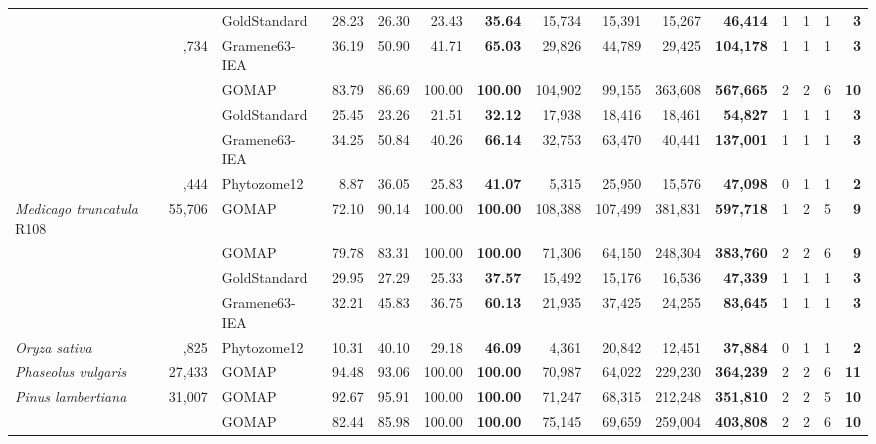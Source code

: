 \documentclass[utf8]{frontiersSCNS}
\begin{document}
\begin{table}[t]
{\begin{threeparttable}
\begin{tabular}{lrlrrr>{\bfseries}r|rrr>{\bfseries}r|rrr>{\bfseries}r}
 &  & GoldStandard & 28.23 & 26.30 & 23.43 & 35.64 & 15,734 & 15,391 & 15,267 & 46,414 & 1 & 1 & 1 & 3\\

\rowcolor{gray!6}  \multirow{-3}{*}{\raggedright\arraybackslash \textit{Hordeum vulgare}} & \multirow{-3}{*}{\raggedleft\arraybackslash 39,734} & Gramene63-IEA & 36.19 & 50.90 & 41.71 & 65.03 & 29,826 & 44,789 & 29,425 & 104,178 & 1 & 1 & 1 & 3\\
\cmidrule{1-15}
 &  & GOMAP & 83.79 & 86.69 & 100.00 & 100.00 & 104,902 & 99,155 & 363,608 & 567,665 & 2 & 2 & 6 & 10\\

\rowcolor{gray!6}   &  & GoldStandard & 25.45 & 23.26 & 21.51 & 32.12 & 17,938 & 18,416 & 18,461 & 54,827 & 1 & 1 & 1 & 3\\

 &  & Gramene63-IEA & 34.25 & 50.84 & 40.26 & 66.14 & 32,753 & 63,470 & 40,441 & 137,001 & 1 & 1 & 1 & 3\\

\rowcolor{gray!6}  \multirow{-4}{*}{\raggedright\arraybackslash \textit{Medicago truncatula} A17} & \multirow{-4}{*}{\raggedleft\arraybackslash 50,444} & Phytozome12 & 8.87 & 36.05 & 25.83 & 41.07 & 5,315 & 25,950 & 15,576 & 47,098 & 0 & 1 & 1 & 2\\
\cmidrule{1-15}
\textit{Medicago truncatula} R108 & 55,706 & GOMAP & 72.10 & 90.14 & 100.00 & 100.00 & 108,388 & 107,499 & 381,831 & 597,718 & 1 & 2 & 5 & 9\\
\cmidrule{1-15}
\rowcolor{gray!6}   &  & GOMAP & 79.78 & 83.31 & 100.00 & 100.00 & 71,306 & 64,150 & 248,304 & 383,760 & 2 & 2 & 6 & 9\\

 &  & GoldStandard & 29.95 & 27.29 & 25.33 & 37.57 & 15,492 & 15,176 & 16,536 & 47,339 & 1 & 1 & 1 & 3\\

\rowcolor{gray!6}   &  & Gramene63-IEA & 32.21 & 45.83 & 36.75 & 60.13 & 21,935 & 37,425 & 24,255 & 83,645 & 1 & 1 & 1 & 3\\

\multirow{-4}{*}{\raggedright\arraybackslash \textit{Oryza sativa}} & \multirow{-4}{*}{\raggedleft\arraybackslash 35,825} & Phytozome12 & 10.31 & 40.10 & 29.18 & 46.09 & 4,361 & 20,842 & 12,451 & 37,884 & 0 & 1 & 1 & 2\\
\cmidrule{1-15}
\rowcolor{gray!6}  \textit{Phaseolus vulgaris} & 27,433 & GOMAP & 94.48 & 93.06 & 100.00 & 100.00 & 70,987 & 64,022 & 229,230 & 364,239 & 2 & 2 & 6 & 11\\
\cmidrule{1-15}
\textit{Pinus lambertiana} & 31,007 & GOMAP & 92.67 & 95.91 & 100.00 & 100.00 & 71,247 & 68,315 & 212,248 & 351,810 & 2 & 2 & 5 & 10\\
\cmidrule{1-15}
\rowcolor{gray!6}   &  & GOMAP & 82.44 & 85.98 & 100.00 & 100.00 & 75,145 & 69,659 & 259,004 & 403,808 & 2 & 2 & 6 & 10\\


\end{tabular}
\end{threeparttable}}
\end{table}
\end{document}

